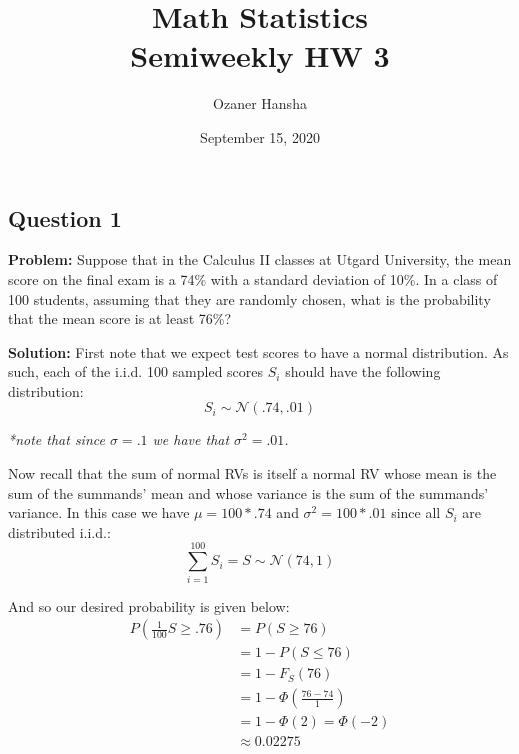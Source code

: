 \documentclass{article}
\begin{document}
\title{Math Statistics\\ Semiweekly HW 3}
\author{Ozaner Hansha}
\date{September 15, 2020}
\maketitle

\subsection*{Question 1}
\noindent\textbf{Problem:} Suppose that in the Calculus II classes at Utgard University, the mean score on the final exam is a 74\% with a standard deviation of 10\%. In a class of 100 students, assuming that they are randomly chosen, what is the probability that the mean score is at least 76\%?
\bigskip

\noindent\textbf{Solution:} First note that we expect test scores to have a normal distribution. As such, each of the i.i.d. 100 sampled scores $S_i$ should have the following distribution:
$$S_i\sim\mathcal N(.74,.01)$$

\textit{*note that since $\sigma=.1$ we have that $\sigma^2=.01$.}
\smallskip

Now recall that the sum of normal RVs is itself a normal RV whose mean is the sum of the summands' mean and whose variance is the sum of the summands' variance. In this case we have $\mu=100*.74$ and $\sigma^2=100*.01$ since all $S_i$ are distributed i.i.d.:
$$\sum_{i=1}^{100} S_i=S\sim\mathcal{N}\left(74,1\right)$$

And so our desired probability is given below:
\begin{align*}
  P\left(\frac{1}{100}S\ge .76\right)&=P\left(S\ge 76\right)\\
  &=1-P\left(S\le 76\right)\tag{complement}\\
  &=1-F_S(76)\tag{def. of cdf}\\
  &=1-\Phi\left(\frac{76-74}{1}\right)\tag{unit normal RV}\\
  &=1-\Phi(2)=\Phi(-2)\tag{complement of unit RV cdf}\\
  &\approx0.02275\tag{unit normal table lookup}
\end{align*}
\end{document}

